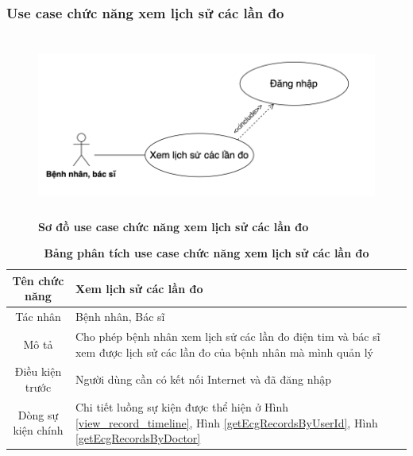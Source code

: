 \subsubsection{Use case chức năng xem lịch sử các lần đo}
  \begin{figure}[H]
    \centering
    \includegraphics[width=15cm,height=6cm]{Images/use_case/use_case_view_history_record.png}
    \caption[Sơ đồ use case chức năng xem lịch sử các lần đo]{\bfseries \fontsize{12pt}{0pt}
    \selectfont Sơ đồ use case chức năng xem lịch sử các lần đo}
    \label{use_case_view_history_record} %
  \end{figure}

  \begin{table}[H]
    \caption{\bfseries \fontsize{12pt}{0pt}\selectfont Bảng phân tích use case chức năng xem lịch sử các lần đo}
    \centering
    \begin{tabularx}{0.9\textwidth}{|c|X|}
      \hline
      \textbf{Tên chức năng} & \textbf{Xem lịch sử các lần đo} \\
      \hline
      Tác nhân & Bệnh nhân, Bác sĩ \\
      \hline
      Mô tả & Cho phép bệnh nhân xem lịch sử các lần đo điện tim và bác sĩ xem được lịch sử các lần đo của bệnh nhân
      mà mình quản lý \\
      \hline
      Điều kiện trước & Người dùng cần có kết nối Internet và đã đăng nhập \\
      \hline
      Dòng sự kiện chính & 
        Chi tiết luồng sự kiện được thể hiện ở Hình \ref{view_record_timeline}, Hình \ref{getEcgRecordsByUserId}, Hình \ref{getEcgRecordsByDoctor} 
        \\
      \hline
    \end{tabularx}
  \end{table}

